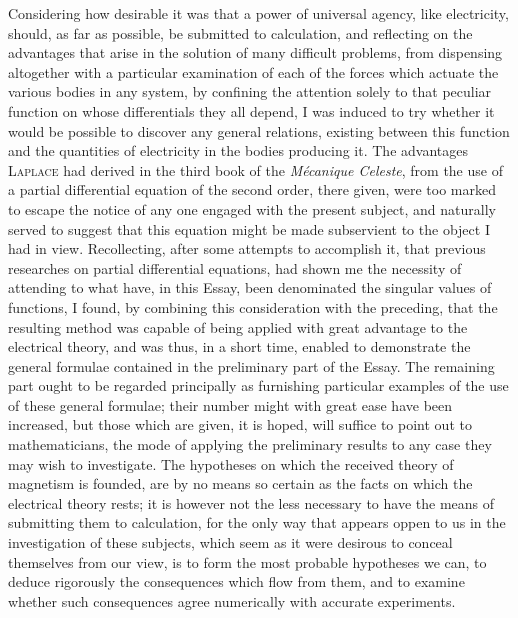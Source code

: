 \documentclass[12pt,notitlepage]{amsart}
\let\Person\textsc
\let\Title\textit
\begin{document}
Considering how desirable it was that a power of universal agency, like
electricity, should, as far as possible,
be submitted to calculation, and reflecting
on the advantages that arise in the solution of many difficult problems, from
dispensing altogether with a particular examination of each of the forces which
actuate the various bodies in any system, by confining the attention solely to
that peculiar function on whose differentials they all depend, I was induced to
try whether it would be possible to discover any general relations, existing
between this function and the quantities of electricity
in the bodies producing it.
The advantages \Person{Laplace} had derived in the
third book of the \Title{M\'ecanique Celeste},
from the use of a partial differential equation
of the second order, there given,
were too marked to escape the notice of any one engaged with the present
subject, and naturally served to suggest that this equation might be made 
subservient to the object I had in view. Recollecting, after some attempts to
accomplish it, that previous researches on partial differential equations, had
shown me the necessity of attending to what have, in this Essay, been 
denominated the singular values of functions, I found, by combining this 
consideration with the preceding, that the resulting method was capable of being
applied with great advantage to the electrical theory, and was thus, in a short
time, enabled to demonstrate the general formulae contained in the preliminary
part of the Essay. The remaining part ought to be regarded principally as 
furnishing particular examples of the use of
these general formulae; their number
might with great ease have been increased, but those which are given, it is
hoped, will suffice to point out to mathematicians, the mode of applying the
preliminary results to any case they may wish to investigate. The hypotheses
on which the received theory of magnetism is founded, are by no means so
certain as the facts on which the electrical theory rests; it is however not
the less necessary to have the means of submitting them to calculation, for
the only way that appears oppen to us in the investigation of these subjects,
which seem as it were desirous to conceal themselves from our view, is to
form the most probable hypotheses we can, to deduce rigorously the consequences
which flow from them, and to examine whether such consequences
agree numerically with accurate experiments.
\end{document}
